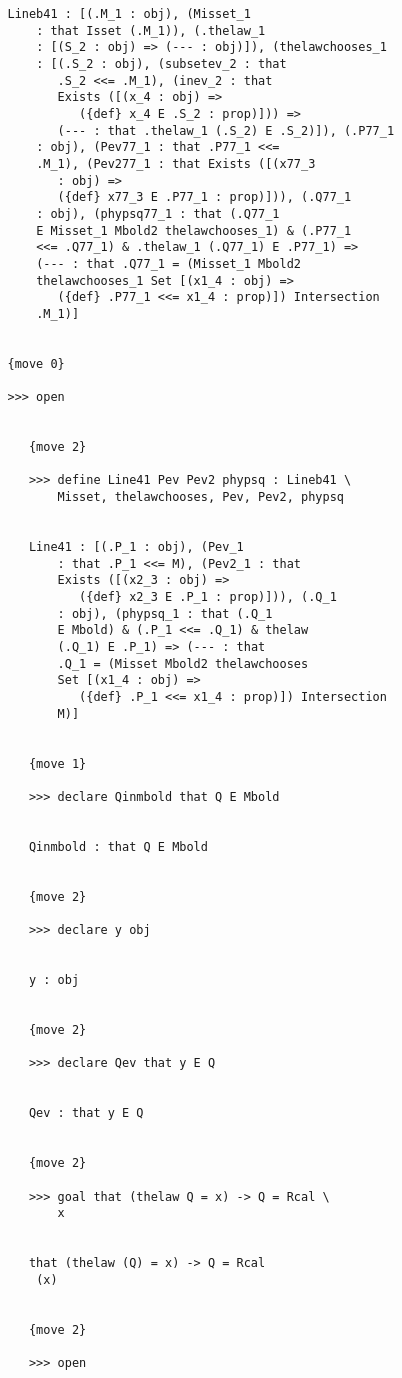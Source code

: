 \documentclass[12pt]{article}
\begin{document}
\begin{verbatim}
   Lineb41 : [(.M_1 : obj), (Misset_1 
       : that Isset (.M_1)), (.thelaw_1 
       : [(S_2 : obj) => (--- : obj)]), (thelawchooses_1 
       : [(.S_2 : obj), (subsetev_2 : that 
          .S_2 <<= .M_1), (inev_2 : that 
          Exists ([(x_4 : obj) => 
             ({def} x_4 E .S_2 : prop)])) => 
          (--- : that .thelaw_1 (.S_2) E .S_2)]), (.P77_1 
       : obj), (Pev77_1 : that .P77_1 <<= 
       .M_1), (Pev277_1 : that Exists ([(x77_3 
          : obj) => 
          ({def} x77_3 E .P77_1 : prop)])), (.Q77_1 
       : obj), (phypsq77_1 : that (.Q77_1 
       E Misset_1 Mbold2 thelawchooses_1) & (.P77_1 
       <<= .Q77_1) & .thelaw_1 (.Q77_1) E .P77_1) => 
       (--- : that .Q77_1 = (Misset_1 Mbold2 
       thelawchooses_1 Set [(x1_4 : obj) => 
          ({def} .P77_1 <<= x1_4 : prop)]) Intersection 
       .M_1)]


   {move 0}

   >>> open


      {move 2}

      >>> define Line41 Pev Pev2 phypsq : Lineb41 \
          Misset, thelawchooses, Pev, Pev2, phypsq


      Line41 : [(.P_1 : obj), (Pev_1 
          : that .P_1 <<= M), (Pev2_1 : that 
          Exists ([(x2_3 : obj) => 
             ({def} x2_3 E .P_1 : prop)])), (.Q_1 
          : obj), (phypsq_1 : that (.Q_1 
          E Mbold) & (.P_1 <<= .Q_1) & thelaw 
          (.Q_1) E .P_1) => (--- : that 
          .Q_1 = (Misset Mbold2 thelawchooses 
          Set [(x1_4 : obj) => 
             ({def} .P_1 <<= x1_4 : prop)]) Intersection 
          M)]


      {move 1}

      >>> declare Qinmbold that Q E Mbold


      Qinmbold : that Q E Mbold


      {move 2}

      >>> declare y obj


      y : obj


      {move 2}

      >>> declare Qev that y E Q


      Qev : that y E Q


      {move 2}

      >>> goal that (thelaw Q = x) -> Q = Rcal \
          x


      that (thelaw (Q) = x) -> Q = Rcal 
       (x)


      {move 2}

      >>> open



\end{verbatim}
\end{document}
